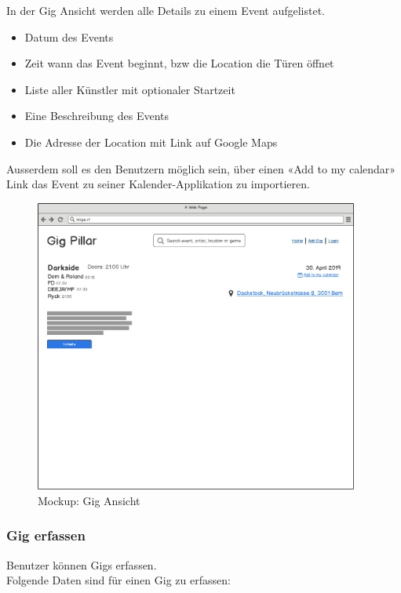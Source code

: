 In der Gig Ansicht werden alle Details zu einem Event aufgelistet.

\begin{itemize}
  \tightlist{}
  \item{} Datum des Events
  \item{} Zeit wann das Event beginnt, bzw die Location die Türen öffnet
  \item{} Liste aller Künstler mit optionaler Startzeit
  \item{} Eine Beschreibung des Events
  \item{} Die Adresse der Location mit Link auf Google Maps
\end{itemize}

\noindent
Ausserdem soll es den Benutzern möglich sein, über einen «Add to my calendar»
Link das Event zu seiner Kalender-Applikation zu importieren.

\begin{figure}[!htb]
  \centering
  \includegraphics[width=0.95\textwidth]{mockups/event.png}
  \caption{Mockup: Gig Ansicht}
\end{figure}

\clearpage
\subsubsection{Gig erfassen}

Benutzer können Gigs erfassen.\\

\noindent
Folgende Daten sind für einen Gig zu erfassen:

